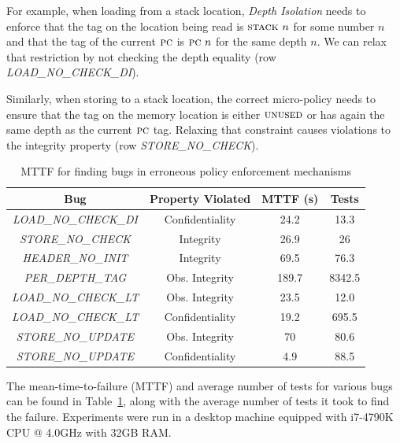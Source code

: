 \documentclass[10pt,conference]{ieeetran}%
\theoremstyle{definition}
\begin{document}
For example, when loading from a stack location, {\em Depth Isolation}
needs to enforce that the tag on the location being read
is $\textsc{stack} ~ n$ for some number $n$ and that the tag of the
current $\textsc{pc}$ is $\textsc{pc} ~ n$ for the same depth $n$. We can relax
that restriction by not checking the depth equality (row {\em
  LOAD\_NO\_CHECK\_DI}).

Similarly, when storing to a stack location, the correct micro-policy
needs to ensure that the tag on the memory location is either
$\textsc{unused}$ or has again the same depth as the current $\textsc{pc}$
tag. Relaxing that constraint causes violations to the integrity
property (row {\em STORE\_NO\_CHECK}).

\begin{table}[]
\centering
\begin{tabular}{c|c|c|c}
  Bug & Property Violated & MTTF (s) & Tests \\
  \hline
      {\em LOAD\_NO\_CHECK\_DI}  & Confidentiality & 24.2 & 13.3 \\
      {\em STORE\_NO\_CHECK} & Integrity & 26.9 & 26 \\
      {\em HEADER\_NO\_INIT} & Integrity & 69.5 & 76.3 \\
  \hline
  \hline
      {\em PER\_DEPTH\_TAG} & Obs. Integrity & 189.7 & 8342.5  \\
      {\em LOAD\_NO\_CHECK\_LT}  & Obs. Integrity & 23.5 & 12.0 \\
      {\em LOAD\_NO\_CHECK\_LT}  & Confidentiality & 19.2 & 695.5 \\
      {\em STORE\_NO\_UPDATE} & Obs. Integrity & 70 & 80.6  \\
      {\em STORE\_NO\_UPDATE} & Confidentiality & 4.9 & 88.5 \\
  \hline
\end{tabular}
\vspace*{1em}
\caption{MTTF for finding bugs in erroneous policy enforcement mechanisms}
\vspace*{-2em}
\label{tab:bug-table}
\end{table}

The mean-time-to-failure (MTTF) and average number of tests for various bugs can be found in
Table~\ref{tab:bug-table}, along with the average number of tests
it took to find the failure. Experiments were run in a desktop
machine equipped with i7-4790K CPU @ 4.0GHz with 32GB RAM.
\end{document}
